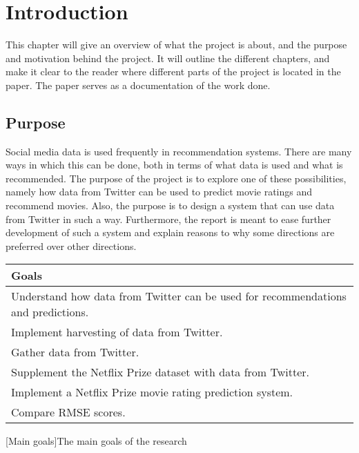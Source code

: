 
\chapter{Introduction}

\minitoc
\setcounter{page}{1}

This chapter will give an overview of what the project is about, and the purpose and motivation behind the project. It will outline the different chapters, and make it clear to the reader where different parts of the project is located in the paper. The paper serves as a documentation of the work done.

\clearpage


\section{Purpose}
Social media data is used frequently in recommendation systems. There are many ways in which this can be done, both in terms of what data is used and what is recommended. The purpose of the project is to explore one of these possibilities, namely how data from Twitter can be used to predict movie ratings and recommend movies. Also, the purpose is to design a system that can use data from Twitter in such a way. Furthermore, the report is meant to ease further development of such a system and explain reasons to why some directions are preferred over other directions.

\renewcommand{\arraystretch}{1.5}
\begin{table}[H]
    \centering
    \begin{tabular}{ p{10cm} }
        \textbf{Goals} \\ \hline
        Understand how data from Twitter can be used for recommendations and predictions. \\
        Implement harvesting of data from Twitter. \\
        Gather data from Twitter. \\
        Supplement the Netflix Prize dataset with data from Twitter. \\
        Implement a Netflix Prize movie rating prediction system. \\
        Compare RMSE scores. \\
    \end{tabular}
    [Main goals]{The main goals of the research}
    \label{tab:main-goals}
\end{table}
\renewcommand{\arraystretch}{1}


